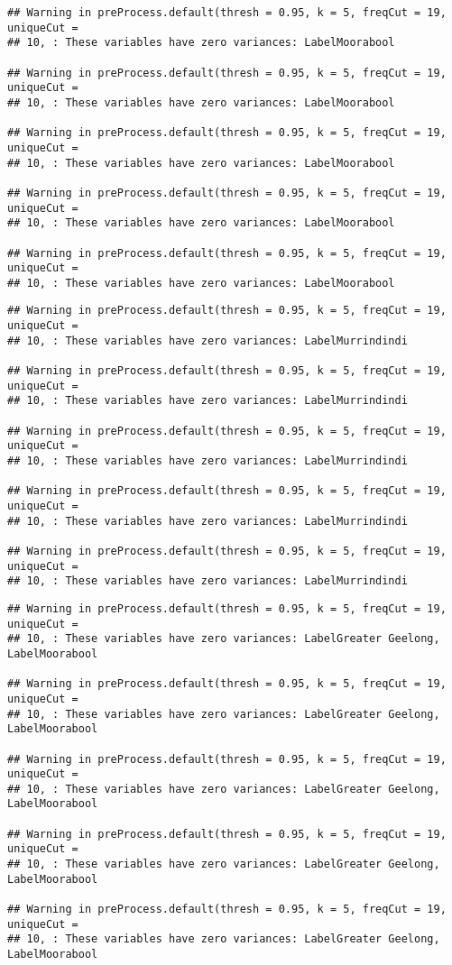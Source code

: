 \documentclass[
]{article}
\begin{document}
\begin{verbatim}
## Warning in preProcess.default(thresh = 0.95, k = 5, freqCut = 19, uniqueCut =
## 10, : These variables have zero variances: LabelMoorabool

## Warning in preProcess.default(thresh = 0.95, k = 5, freqCut = 19, uniqueCut =
## 10, : These variables have zero variances: LabelMoorabool

## Warning in preProcess.default(thresh = 0.95, k = 5, freqCut = 19, uniqueCut =
## 10, : These variables have zero variances: LabelMoorabool

## Warning in preProcess.default(thresh = 0.95, k = 5, freqCut = 19, uniqueCut =
## 10, : These variables have zero variances: LabelMoorabool

## Warning in preProcess.default(thresh = 0.95, k = 5, freqCut = 19, uniqueCut =
## 10, : These variables have zero variances: LabelMoorabool
\end{verbatim}

\begin{verbatim}
## Warning in preProcess.default(thresh = 0.95, k = 5, freqCut = 19, uniqueCut =
## 10, : These variables have zero variances: LabelMurrindindi

## Warning in preProcess.default(thresh = 0.95, k = 5, freqCut = 19, uniqueCut =
## 10, : These variables have zero variances: LabelMurrindindi

## Warning in preProcess.default(thresh = 0.95, k = 5, freqCut = 19, uniqueCut =
## 10, : These variables have zero variances: LabelMurrindindi

## Warning in preProcess.default(thresh = 0.95, k = 5, freqCut = 19, uniqueCut =
## 10, : These variables have zero variances: LabelMurrindindi

## Warning in preProcess.default(thresh = 0.95, k = 5, freqCut = 19, uniqueCut =
## 10, : These variables have zero variances: LabelMurrindindi
\end{verbatim}

\begin{verbatim}
## Warning in preProcess.default(thresh = 0.95, k = 5, freqCut = 19, uniqueCut =
## 10, : These variables have zero variances: LabelGreater Geelong, LabelMoorabool

## Warning in preProcess.default(thresh = 0.95, k = 5, freqCut = 19, uniqueCut =
## 10, : These variables have zero variances: LabelGreater Geelong, LabelMoorabool

## Warning in preProcess.default(thresh = 0.95, k = 5, freqCut = 19, uniqueCut =
## 10, : These variables have zero variances: LabelGreater Geelong, LabelMoorabool

## Warning in preProcess.default(thresh = 0.95, k = 5, freqCut = 19, uniqueCut =
## 10, : These variables have zero variances: LabelGreater Geelong, LabelMoorabool

## Warning in preProcess.default(thresh = 0.95, k = 5, freqCut = 19, uniqueCut =
## 10, : These variables have zero variances: LabelGreater Geelong, LabelMoorabool
\end{verbatim}
\end{document}

